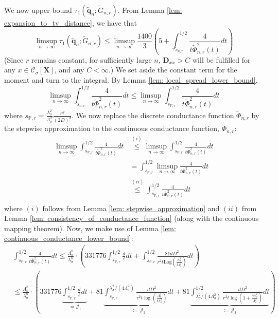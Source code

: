 \documentclass{article}
\newcommand{\1}{\mathbf{1}}
\newcommand{\Log}{\mathrm{Log}}
\newcommand{\qbf}{\mathbf{q}}
\newcommand{\Xbf}{\mathbf{X}}
\newcommand{\Dbf}{\mathbf{D}}
\newcommand{\Pbb}{\mathbb{P}}
\newcommand{\Cset}{\mathcal{C}}
\newcommand{\Csig}{\Cset_{\sigma}}
\theoremstyle{aldenthm}
\begin{document}
We now upper bound $\tau_{1}(\widetilde{\qbf}_n; \widetilde{G}_{n,r})$.  From Lemma \ref{lem: expansion_to_tv_distance}, we have that
\begin{equation}
\label{eqn: mixing_time_bound_on_neighborhood_graph}
\limsup_{n \to \infty} \tau_{1}(\widetilde{\qbf}_n; \widetilde{G}_{n,r}) \leq \limsup_{n \to \infty} \frac{1400}{3}\left(5 + \int_{\widetilde{s}_{n,r}}^{1/2} \frac{4}{t\widetilde{\Phi}_{n,r}^2(t)} dt\right)
\end{equation}
(Since $r$ remains constant, for sufficiently large $n$, $\Dbf_{xx} > C$ will be fulfilled for any $x \in \Csig[\Xbf]$, and any $C < \infty$.)
We set aside the constant term for the moment and turn to the integral. By Lemma \ref{lem: local_spread_lower_bound},
\begin{equation*}
\limsup_{n \to \infty}\int_{\widetilde{s}_{n,r}}^{1/2} \frac{4}{t\widetilde{\Phi}_{n,r}^2(t)} dt \leq \limsup_{n \to \infty}\int_{ s_{\Pbb,r}}^{1/2} \frac{4}{t\widetilde{\Phi}_{n,r}^2(t)} dt
\end{equation*}
where $s_{\Pbb,r} = \frac{\lambda_{\sigma}^2}{\Lambda_{\sigma}^2} \frac{r^d}{(2D)^d}$. We now replace the discrete conductance function $\widetilde{\Phi}_{n,r}$ by the stepwise approximation to the continuous conductance function, $\overline{\Phi}_{n,r}$:
\begin{align*}
\limsup_{n \to \infty}\int_{s_{\Pbb,r}}^{1/2} \frac{4}{t\widetilde{\Phi}_{n,r}^2(t)} dt & \overset{(i)}{\leq} \limsup_{n \to \infty}\int_{s_{\Pbb,r}}^{1/2} \frac{4}{t\overline{\Phi}_{n,r}^2(t)} dt \\
& = \int_{s_{\Pbb,r}}^{1/2} \limsup_{n \to \infty} \frac{4}{t\overline{\Phi}_{n,r}^2(t)} dt\\
& \overset{(ii)}{\leq} \int_{s_{\Pbb,r}}^{1/2} \frac{4}{t\overline{\Phi}_{\Pbb,r}^2(t)} dt \\
\end{align*}
where $(i)$ follows from Lemma \ref{lem: stepwise_approximation} and $(ii)$ from Lemma \ref{lem: consistency_of_conductance_function} (along with the continuous mapping theorem). Now, we make use of Lemma \ref{lem: continuous_conductance_lower_bound}:
\begin{align*}
& \int_{s_{\Pbb,r}}^{1/2} \frac{4}{t\overline{\Phi}_{\Pbb,r}^2(t)} dt \leq \frac{\Lambda_{\sigma}^8}{\lambda_{\sigma}^8} \cdot \left( 331776
\int_{s_{\Pbb,r}}^{1/2} \frac{d}{t} dt + \int_{s_{\Pbb,r}}^{1/2} \frac{81dD^2}{r^2t \Log(\frac{\Lambda_{\sigma}^2}{t\lambda_{\sigma}^2})}  dt\right) \\
& \leq \frac{\Lambda_{\sigma}^8}{\lambda_{\sigma}^8} \cdot \left( 331776
\underbrace{\int_{s_{\Pbb,r}}^{1/2} \frac{d}{t} dt}_{:= \mathcal{J}_1} + 
81\underbrace{\int_{s_{\Pbb,r}}^{\lambda_{\sigma}^2/(4 \Lambda_{\sigma}^2)} \frac{dD^2}{r^2t \log(\frac{\Lambda_{\sigma}^2}{t\lambda_{\sigma}^2})} dt}_{:= \mathcal{J}_2} +
81\underbrace{\int_{\lambda_{\sigma}^2/(4 \Lambda_{\sigma}^2)}^{1/2} \frac{dD^2}{r^2t \log(1 + \frac{4 \lambda_{\sigma}^2}{\Lambda_{\sigma}^2})}dt}_{:= \mathcal{J}_3}  \right)
\end{align*}
\end{document}
